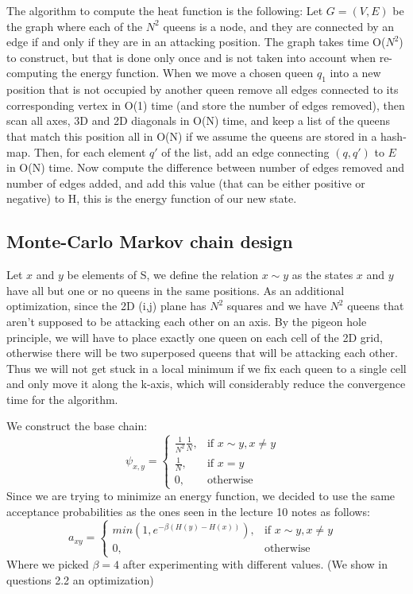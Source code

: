 \documentclass{article}
\begin{document}
The algorithm to compute the heat function is the following: \newline 
Let $G=(V,E)$ be the graph where each of the $N^2$ queens is a node, and they are connected by an edge if and only if they are in an attacking position. The graph takes time O($N^2$) to construct, but that is done only once and is not taken into account when re-computing the energy function. When we move a chosen queen $q_1$ into a new position that is not occupied by another queen remove all edges connected to its corresponding vertex in O(1) time (and store the number of edges removed), then scan all axes, 3D and 2D diagonals in O(N) time, and keep a list of the queens that match this position all in O(N) if we assume the queens are stored in a hash-map. Then, for each element $q'$ of the list, add an edge connecting $(q,q')$ to $E$ in O(N) time. Now compute the difference between number of edges removed and number of edges added, and add this value (that can be either positive or negative) to H, this is the energy function of our new state.
\subsection{Monte-Carlo Markov chain design}
Let $x$ and $y$ be elements of S, we define the relation $x \sim y$ as the states $x$ and $y$ have all but one or no queens in the same positions. \newline
As an additional optimization, since the 2D (i,j) plane has $N^2$ squares and we have $N^2$ queens that aren't supposed to be attacking each other on an axis. By the pigeon hole principle, we will have to place exactly one queen on each cell of the 2D grid, otherwise there will be two superposed queens that will be attacking each other. Thus we will not get stuck in a local minimum if we fix each queen to a single cell and only move it along the k-axis, which will considerably reduce the convergence time for the algorithm.

We construct the base chain: $$\psi_{x,y}=\begin{cases}
			\frac{1}{N^2} \frac{1}{N} , & \text{if $x \sim y, x \neq y$ }\\
            \frac{1}{N}, & \text{if $x=y$} \\
            0, & \text{otherwise}
		 \end{cases}$$ \newline 
Since we are trying to minimize an energy function, we decided to use the same acceptance probabilities as the ones seen in the lecture 10 notes as follows:
$$a_{xy}=\begin{cases}
			min(1,e^{-\beta(H(y)-H(x))}) , & \text{if $x \sim y, x \neq y$ } \\
            0, & \text{otherwise}
		 \end{cases}
$$
Where we picked $\beta = 4$ after experimenting with different values. (We show in questions 2.2 an optimization)
\end{document}
